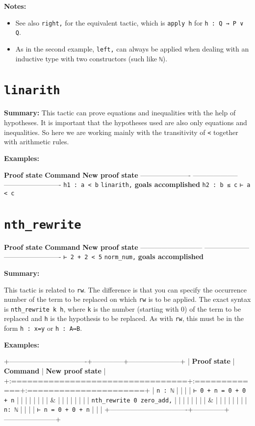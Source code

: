 \documentclass{memoir}
\begin{document}
\textbf{Notes:}

\begin{itemize}
\item See also \Verb|right,| for the equivalent tactic, which is \Verb|apply h| for \Verb|h : Q → P ∨ Q|.\item As in the second example, \Verb|left,| can always be applied when dealing with an inductive type with two constructors (such like \Verb|ℕ|).

\end{itemize}




\section{\Verb|linarith|}

\textbf{Summary:} This tactic can prove equations and inequalities with the help of hypotheses. It is important that the hypotheses used are also only equations and inequalities. So here we are working mainly with the transitivity of \Verb|<| together with arithmetic rules.

\textbf{Examples:}

\textbf{Proof state} \textbf{Command} \textbf{New proof state}
---------------------- -------------------- -------------------------
\Verb|h1 : a < b| \Verb|linarith,| \textbf{goals accomplished}
\Verb|h2 : b ≤ c|
\Verb|⊢ a < c|




\section{\Verb|nth_rewrite|}

\textbf{Proof state} \textbf{Command} \textbf{New proof state}
--------------------------- -------------------- -------------------------
\Verb|⊢ 2 + 2 < 5| \Verb|norm_num,| \textbf{goals accomplished}

\textbf{Summary:}

This tactic is related to \Verb|rw|. The difference is that you can specify the occurrence number of the term to be replaced on which \Verb|rw| is to be applied. The exact syntax is \Verb|nth_rewrite k h|, where \Verb|k| is the number (starting with $0$) of the term to be replaced and \Verb|h| is the hypothesis to be replaced. As with \Verb|rw|, this must be in the form \Verb|h : x=y| or \Verb|h : A↔B|.

\textbf{Examples:}

+----------------------------------+--------------+-----------------------+
| \textbf{Proof state} | \textbf{Command} | \textbf{New proof state} |
+:=================================+:=============+:======================+
| \Verb|n : ℕ| | | |
| \Verb|⊢ 0 + n = 0 + 0 + n| | | |
| | | |
| & | | |
| | | |
| \Verb|nth_rewrite 0 zero_add,| | | |
| | | |
| & | | |
| | | |
| \Verb|n: ℕ| | | |
| \Verb|⊢ n = 0 + 0 + n| | | |
+----------------------------------+--------------+-----------------------+
\end{document}
